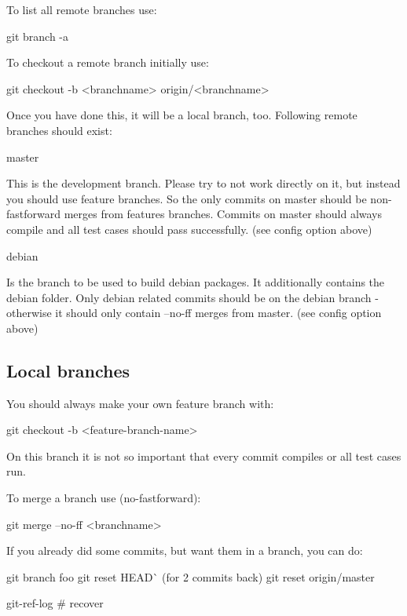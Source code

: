 To list all remote branches use\+: \begin{DoxyVerb}    git branch -a
\end{DoxyVerb}


To checkout a remote branch initially use\+: \begin{DoxyVerb}    git checkout -b <branchname> origin/<branchname>
\end{DoxyVerb}


Once you have done this, it will be a local branch, too. Following remote branches should exist\+: \begin{DoxyVerb}    master
\end{DoxyVerb}


This is the development branch. Please try to not work directly on it, but instead you should use feature branches. So the only commits on master should be non-\/fastforward merges from features branches. Commits on master should always compile and all test cases should pass successfully. (see config option above)

\begin{DoxyVerb}    debian
\end{DoxyVerb}


Is the branch to be used to build debian packages. It additionally contains the debian folder. Only debian related commits should be on the debian branch -\/ otherwise it should only contain --no-\/ff merges from master. (see config option above)

\subsection*{Local branches}

You should always make your own feature branch with\+: \begin{DoxyVerb}    git checkout -b <feature-branch-name>
\end{DoxyVerb}


On this branch it is not so important that every commit compiles or all test cases run.

To merge a branch use (no-\/fastforward)\+: \begin{DoxyVerb}    git merge --no-ff <branchname>
\end{DoxyVerb}


If you already did some commits, but want them in a branch, you can do\+: \begin{DoxyVerb}    git branch foo
    git reset HEAD^^  (for 2 commits back)
    git reset origin/master

    git-ref-log # recover
\end{DoxyVerb}


